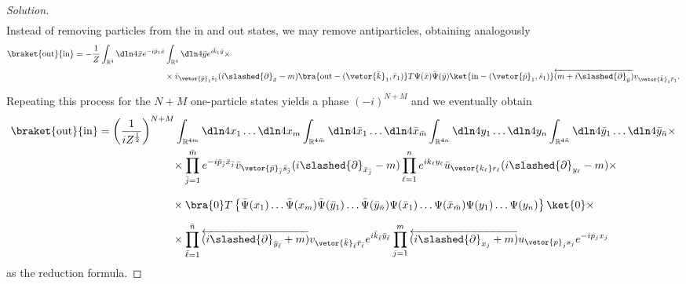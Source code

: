 \begin{proof}[Solution]
\begin{align*}
   \end{align*}
   Instead of removing particles from the in and out states, we may remove antiparticles, obtaining analogously
   \begin{align*}
      \braket{\mathrm{out}}{\mathrm{in}} &= -\frac{1}{Z} \int_{\mathbb{R}^4} \dln4{\bar{x}} e^{-i \bar{p}_1 \bar{x}} \int_{\mathbb{R}^4} \dln4{\bar{y}} e^{i \bar{k}_1 \bar{y}} \times \\
                                         &{}\phantom{Z \int_{\mathbb{R}^4} \dln4x\int_{\mathbb{R}^4} \dln4{\bar{y}}} \times \bar{v}_{\vetor{\bar{p}}_1 \bar{s}_1} (i \slashed{\partial}_{\bar{x}} - m) \bra{\mathrm{out} - (\vetor{\bar{k}}_1, \bar{r}_1)} T \Psi(\bar{x}) \bar{\Psi}(\bar{y}) \ket{\mathrm{in} - (\vetor{\bar{p}}_1, \bar{s}_1)} \overleftarrow{(m + i \slashed{\partial}_{\bar{y}})} v_{\vetor{\bar{k}}_1 \bar{r}_1}.
   \end{align*}
   Repeating this process for the \(N + M\) one-particle states yields a phase \((-i)^{N+M}\) and we eventually obtain
   \begin{align*}
      \braket{\mathrm{out}}{\mathrm{in}} &= \left(\frac{1}{iZ^{\frac12}}\right)^{N+M} \int_{\mathbb{R}^{4m}} \dln4{x_1} \dots \dln4{x_m} \int_{\mathbb{R}^{4 \bar{m}}} \dln4{\bar{x}_1} \dots  \dln4{\bar{x}_{\bar{m}}} \int_{\mathbb{R}^{4n}} \dln4{y_1} \dots\dln4{y_n} \int_{\mathbb{R}^{4{\bar{n}}}} \dln4{\bar{y}_1} \dots \dln4{\bar{y}_{\bar{n}}} \times\\
                                         &{}\phantom{=\left(\frac{1}{iZ^{\frac12}}\right)^{N+M}}\times  
                                         \prod_{\bar{j} = 1}^{\bar{m}} e^{-i \bar{p}_{\bar{j}} \bar{x}_{\bar{j}}} \bar{v}_{\vetor{\bar{p}}_{\bar{j}} \bar{s}_{\bar{j}}} (i \slashed{\partial}_{\bar{x}_{\bar{j}}} - m)
                                         \prod_{\ell = 1}^{n} e^{i k_{\ell} y_{\ell}} \bar{u}_{\vetor{k_{\ell}} r_{\ell}} (i \slashed{\partial}_{y_{\ell}} - m) \times\\
                                         &{}\phantom{=\left(\frac{1}{iZ^{\frac12}}\right)^{N+M}}\times  
                                         \bra{0} T \left\{\bar{\Psi}(x_1) \dots \bar{\Psi}(x_m) \bar{\Psi}(\bar{y}_1)\dots \bar{\Psi}(\bar{y}_{\bar{n}}) \Psi(\bar{x}_1) \dots \Psi(\bar{x}_{\bar{m}}) \Psi(y_1)\dots \Psi(y_n)\right\}\ket{0}\times\\
                                         &{}\phantom{=\left(\frac{1}{iZ^{\frac12}}\right)^{N+M}}\times  
                                         \prod_{\bar{\ell} = 1}^{\bar{n}}  \overleftarrow{(i \slashed{\partial}_{\bar{y}_{\bar{\ell}}} + m)}v_{\vetor{\bar{k}}_{\bar{\ell}} \bar{r}_{\bar{\ell}}} e^{i \bar{k}_{\bar{\ell}} \bar{y}_{\bar{\ell}}} 
                                         \prod_{j = 1}^{m} \overleftarrow{(i \slashed{\partial}_{x_{j}} + m)}u_{\vetor{p}_{j} s_{j}} e^{-i p_{j} x_{j}} 
   \end{align*}
   as the reduction formula.
\end{proof}
